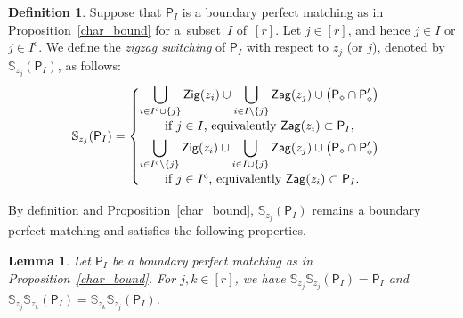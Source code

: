 \documentclass[pdftex]{sigma}
\numberwithin{equation}{section}
\newtheorem{Lemma}[Theorem]{Lemma}
\theoremstyle{definition}
\newtheorem{Definition}[Theorem]{Definition}
\newcommand{\BS}{\mathbb{S}}
\newcommand{\rmc}{\mathrm{c}}
\newcommand{\sfP}{\mathsf{P}}
\newcommand{\Zig}{\mathsf{Zig}}
\newcommand{\Zag}{\mathsf{Zag}}
\newcommand{\cPM}{\sfP_\diamond}
\begin{document}
\begin{Definition}
\label{def_switching}
Suppose that $\sfP_I$ is a boundary perfect matching as in Proposition~\ref{char_bound} for a~subset~$I$ of~$[r]$.
Let $j\in [r]$, and hence $j\in I$ or $j\in I^\rmc$.
We define the \emph{zigzag switching} of $\sfP_I$ with respect to $z_j$ (or $j$), denoted by $\BS_{z_j}(\sfP_I)$, as follows:
\begin{gather*}
\BS_{z_j}(\sfP_I)=
\begin{cases}
\displaystyle\bigcup_{i\in I^\rmc\cup\{j\}}\Zig(z_i)\cup\bigcup_{i\in I{\setminus}\{j\}}\Zag(z_j)\cup\big(\cPM\cap\cPM^\prime\big)
\\
\qquad \text{if $j\in I$, equivalently $\Zag(z_i)\subset\sfP_I$}, \vspace{1mm} \\
\displaystyle\bigcup_{i\in I^\rmc{\setminus}\{j\}}\Zig(z_i)\cup\bigcup_{i\in I\cup\{j\}}\Zag(z_j)\cup\big(\cPM\cap\cPM^\prime\big)
\\
\qquad \text{if $j\in I^\rmc$, equivalently $\Zag(z_i)\subset\sfP_I$}.
\end{cases}
\end{gather*}
\end{Definition}

By definition and Proposition~\ref{char_bound}, $\BS_{z_j}(\sfP_I)$ remains a boundary perfect matching and satisfies the following properties.

\begin{Lemma}
Let $\sfP_I$ be a boundary perfect matching as in Proposition~{\rm \ref{char_bound}}.
For $j, k\in [r]$, we have $\BS_{z_j}\BS_{z_j}(\sfP_I)=\sfP_I$ and $\BS_{z_j}\BS_{z_k}(\sfP_I)=\BS_{z_k}\BS_{z_j}(\sfP_I)$.
\end{Lemma}
\end{document}
